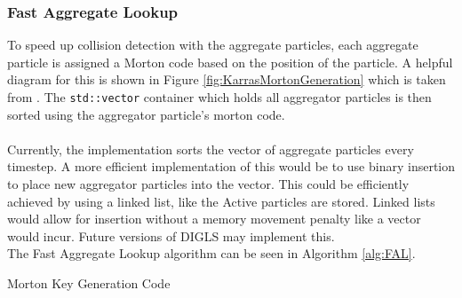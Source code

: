 \documentclass[fleqn,10pt]{UserGuideArx} %
\begin{document}
\subsubsection{Fast Aggregate Lookup}
To speed up collision detection with the aggregate particles, each aggregate particle is assigned a Morton code based on the position of the particle. A helpful diagram for this is shown in Figure \ref{fig:KarrasMortonGeneration} which is taken from \cite{Karras:2012}. The \texttt{std\allowbreak::vector} container which holds all aggregator particles is then sorted using the aggregator particle's morton code. \\~\\
Currently, the implementation sorts the vector of aggregate particles every timestep. A more efficient implementation of this would be to use binary insertion to place new aggregator particles into the vector. This could be efficiently achieved by using a linked list, like the Active particles are stored. Linked lists would allow for insertion without a memory movement penalty like a vector would incur. Future versions of DIGLS may implement this.\\
The Fast Aggregate Lookup algorithm can be seen in Algorithm \ref{alg:FAL}.

\begin{algorithm}
    \caption{Morton Key Generation Code \cite{Karras:2012}}\label{alg:Mcodes}
    

\end{algorithm}
\end{document}
